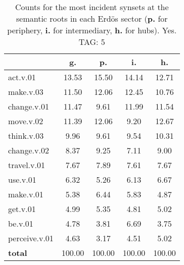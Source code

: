 \begin{table}[h!]
\begin{center}
\begin{tabular}{| l | c | c | c | c |}\hline
 & g. & p. & i. & h. \\\hline
act.v.01 & 13.53  & 15.50  & 14.14  & 12.71 \\\hline
make.v.03 & 11.50  & 12.06  & 12.45  & 10.76 \\\hline
change.v.01 & 11.47  & 9.61  & 11.99  & 11.54 \\\hline
move.v.02 & 11.39  & 12.06  & 9.20  & 12.67 \\\hline
think.v.03 & 9.96  & 9.61  & 9.54  & 10.31 \\\hline
change.v.02 & 8.37  & 9.25  & 7.11  & 9.00 \\\hline
travel.v.01 & 7.67  & 7.89  & 7.61  & 7.67 \\\hline
use.v.01 & 6.32  & 5.26  & 6.13  & 6.67 \\\hline
make.v.01 & 5.38  & 6.44  & 5.83  & 4.87 \\\hline
get.v.01 & 4.99  & 5.35  & 4.81  & 5.02 \\\hline
be.v.01 & 4.78  & 3.81  & 6.69  & 3.75 \\\hline
perceive.v.01 & 4.63  & 3.17  & 4.51  & 5.02 \\\hline
{{\bf total}} & 100.00  & 100.00  & 100.00  & 100.00 \\\hline
\end{tabular}
\caption{Counts for the most incident synsets at the semantic roots in each Erd\"os sector ({\bf p.} for periphery, {\bf i.} for intermediary, {\bf h.} for hubs). Yes. TAG: 5}
\end{center}
\end{table}
